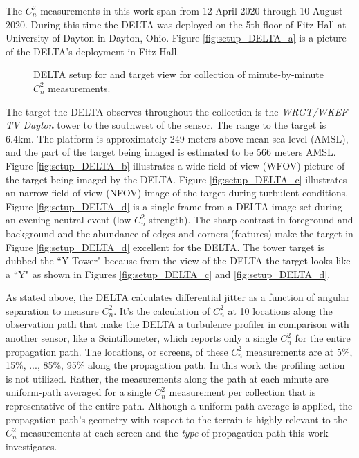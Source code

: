 The $C_{n}^{2}$ measurements in this work span from 12 April 2020 through 10 August 2020. During this time the DELTA was deployed on the 5th floor of Fitz Hall at University of Dayton in Dayton, Ohio. Figure \ref{fig:setup_DELTA_a} is a picture of the DELTA's deployment in Fitz Hall.
\begin{figure}[p!]
	\centering
	\hfill
	\hfill
	\caption{DELTA setup for and target view for collection of minute-by-minute $C_{n}^{2}$ measurements.}
	\label{fig:setup_DELTA}
\end{figure}
The target the DELTA observes throughout the collection is the \textit{WRGT/WKEF TV Dayton} tower to the southwest of the sensor. The range to the target is 6.4km. The platform is approximately 249 meters above mean sea level (AMSL), and the part of the target being imaged is estimated to be 566 meters AMSL. Figure \ref{fig:setup_DELTA_b} illustrates a wide field-of-view (WFOV) picture of the target being imaged by the DELTA. Figure \ref{fig:setup_DELTA_c} illustrates an narrow field-of-view (NFOV) image of the target during  turbulent conditions. Figure \ref{fig:setup_DELTA_d} is a single frame from a DELTA image set during an evening neutral event (low $C_{n}^{2}$ strength). The sharp contrast in foreground and background and the abundance of edges and corners (features) make the target in Figure \ref{fig:setup_DELTA_d} excellent for the DELTA. The tower target is dubbed the ``Y-Tower" because from the view of the DELTA the target looks like a ``Y" as shown in Figures \ref{fig:setup_DELTA_c} and \ref{fig:setup_DELTA_d}.

As stated above, the DELTA calculates differential jitter as a function of angular separation to measure $C_{n}^{2}$. It's the calculation of $C_{n}^{2}$ at 10 locations along the observation path that make the DELTA a turbulence profiler in comparison with another sensor, like a Scintillometer, which reports only a single $C_{n}^{2}$ for the entire propagation path. The locations, or screens, of these $C_{n}^{2}$ measurements are at 5\%, 15\%, ..., 85\%, 95\% along the propagation path. In this work the profiling action is not utilized. Rather, the measurements along the path at each minute are uniform-path averaged for a single $C_{n}^{2}$ measurement per collection that is representative of the entire path. Although a uniform-path average is applied, the propagation path's geometry with respect to the terrain is highly relevant to the $C_{n}^{2}$ measurements at each screen and the \emph{type} of propagation path this work investigates.

